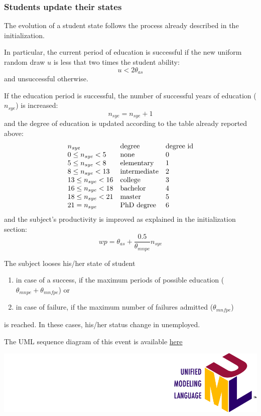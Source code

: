 \documentclass{book}
\newcommand{\umllocation}{file:///Users/giulioni/Dropbox/svn/sfcabm_my/documentation}
\begin{document}
\subsubsection{Students update their states}

The evolution of a student state follows the process already described in the initialization.

In particular, the current period of education is successful if the new uniform random draw $u$ is less that two times the student ability:
\[
	u<2\theta_{as}
\]
and unsuccessful otherwise.

If the education period is successful, the number of successful years of education ($n_{sye}$) is increased:
\[
n_{sye}=n_{sye}+1
\]
and the degree of education is updated according to the table already reported above:
\[
	\begin{array}{l l l}
		n_{sye}& \textnormal{degree}& \textnormal{degree id}\\
	0\le n_{sye}<5 & \textnormal{none}&0\\
	5\le n_{sye}<8 & \textnormal{elementary}&1\\
	8\le n_{sye}<13 & \textnormal{intermediate}&2\\
	13\le n_{sye}<16 & \textnormal{college}&3\\
	16\le n_{sye}<18 & \textnormal{bachelor}&4\\
	18\le n_{sye}<21 & \textnormal{master}&5\\
	21= n_{sye} & \textnormal{PhD degree}&6
	\end{array}
\]
and the subject's productivity is improved as explained in the initialization section: 
\[
	wp=\theta_{as}+\frac{0.5}{\theta_{mnpe}}n_{sye}
\]

The subject looses his/her state of student 
\begin{enumerate}
	\item in case of a success, if the maximum periods of possible education ($\theta_{mnpe}+\theta_{mnfpe}$) or
	\item in case of failure, if the maximum number of failures admitted ($\theta_{mnfpe}$)
\end{enumerate}
is reached. In these cases, his/her status change in unemployed.

The UML sequence diagram of this event is available \href{\umllocation/stepStudentState.html}{here}
\begin{marginfigure}
	\includegraphics[scale=0.1]{uml.png}
\end{marginfigure}
\end{document}
